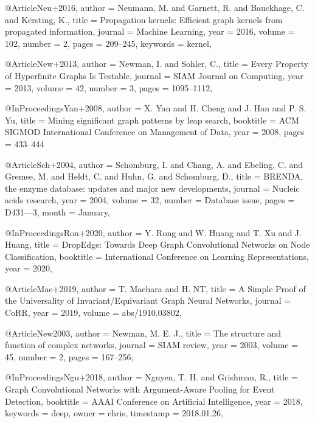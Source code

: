 @Article{Neu+2016,
  author   = {Neumann, M. and Garnett, R. and Bauckhage, C. and Kersting, K.},
  title    = {Propagation kernels: {E}fficient graph kernels from propagated information},
  journal  = {Machine Learning},
  year     = {2016},
  volume   = {102},
  number   = {2},
  pages    = {209--245},
  keywords = {kernel},
}

@Article{New+2013,
  author  = {Newman, I. and Sohler, C.},
  title   = {Every Property of Hyperfinite Graphs Is Testable},
  journal = {SIAM Journal on Computing},
  year    = {2013},
  volume  = {42},
  number  = {3},
  pages   = {1095--1112},
}

@InProceedings{Yan+2008,
  author    = {X. Yan and H. Cheng and J. Han and P. S. Yu},
  title     = {Mining significant graph patterns by leap search},
  booktitle = {{ACM} {SIGMOD} International Conference on Management of Data},
  year      = {2008},
  pages     = {433--444}
}

@Article{Sch+2004,
  author  = {Schomburg, I. and Chang, A. and Ebeling, C. and Gremse, M. and Heldt, C. and Huhn, G. and Schomburg, D.},
  title   = {{BRENDA}, the enzyme database: updates and major new developments},
  journal = {Nucleic acids research},
  year    = {2004},
  volume  = {32},
  number  = {Database issue},
  pages   = {D431—3},
  month   = {January},
}

@InProceedings{Ron+2020,
  author    = {Y. Rong and W. Huang and T. Xu and J. Huang},
  title     = {{DropEdge:} {Towards} Deep Graph Convolutional Networks on Node Classification},
  booktitle = {International Conference on Learning Representations},
  year      = {2020},
}

@Article{Mae+2019,
  author  = {T. Maehara and H. NT},
  title   = {A Simple Proof of the Universality of Invariant/Equivariant Graph Neural Networks},
  journal = {CoRR},
  year    = {2019},
  volume  = {abs/1910.03802},
}

@Article{New2003,
  author  = {Newman, M. E. J.},
  title   = {The structure and function of complex networks},
  journal = {SIAM review},
  year    = {2003},
  volume  = {45},
  number  = {2},
  pages   = {167--256},
}

@InProceedings{Ngu+2018,
  author    = {Nguyen, T. H. and Grishman, R.},
  title     = {Graph Convolutional Networks with Argument-Aware Pooling for Event Detection},
  booktitle = {AAAI Conference on Artificial Intelligence},
  year      = {2018},
  keywords  = {deep},
  owner     = {chris},
  timestamp = {2018.01.26},
}

